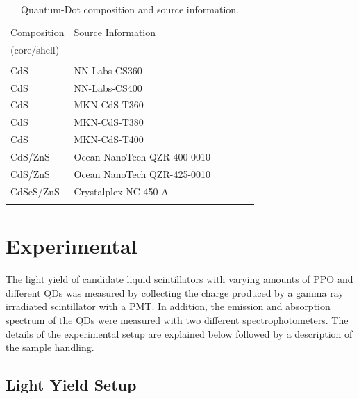 \documentclass{JINST}
\begin{document}
\begin{table}
\caption{Quantum-Dot composition and source information. \label{quantum_dots_table}}
 \begin{center}
    \begin{tabular}{llllll}
       Composition  & Source Information \\
       (core/shell)  & & \\
       \hline\hline\\[-5px]
         CdS &   NN-Labs-CS360\cite{nnLabs} \\
       \hline
         CdS &    NN-Labs-CS400\cite{nnLabs}   \\
       \hline
         CdS &  MKN-CdS-T360\cite{mkNano} \\
       \hline
         CdS &  MKN-CdS-T380\cite{mkNano}   \\
       \hline
        CdS &  MKN-CdS-T400\cite{mkNano} \\
             \hline
      CdS/ZnS  &  Ocean NanoTech QZR-400-0010\cite{oceanNanotech} \\
       \hline
      CdS/ZnS & Ocean NanoTech QZR-425-0010 \cite{oceanNanotech} \\
      \hline
        CdSeS/ZnS &   Crystalplex NC-450-A \cite{crystalplex} \\
      \\[5px] 
      \hline
 \hline
    \end{tabular}
  \end{center}
\end{table}

\section{Experimental}
\label{exp_sec}
The light yield of candidate liquid scintillators with varying amounts of PPO and different QDs was measured by collecting the charge produced by a gamma ray irradiated scintillator with a PMT. In addition, the emission and absorption spectrum of the QDs were measured with two different spectrophotometers. The details of the experimental setup are explained below followed by a description of the sample handling.

\subsection{Light Yield Setup}
\label{ly_setup_sec}
\end{document}
